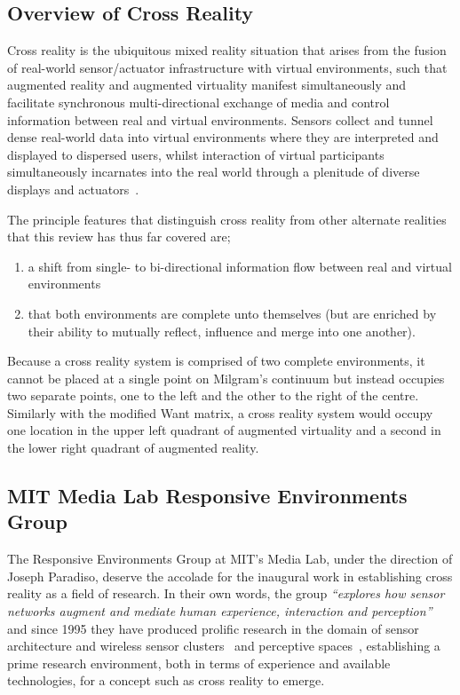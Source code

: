 \subsection{Overview of Cross Reality}
Cross reality is the ubiquitous mixed reality situation that arises from the fusion of real-world sensor/actuator infrastructure with virtual environments, such that augmented reality and augmented virtuality manifest simultaneously and facilitate synchronous multi-directional exchange of media and control information between real and virtual environments. Sensors collect and tunnel dense real-world data into virtual environments where they are interpreted and displayed to dispersed users, whilst interaction of virtual participants simultaneously incarnates into the real world through a plenitude of diverse displays and actuators~\cite{Paradiso2009}.

The principle features that distinguish cross reality from other alternate realities that this review has thus far covered are;
\begin{enumerate}
	\item a shift from single- to bi-directional information flow between real and virtual environments~\cite{kim:practical}
	\item that both environments are complete unto themselves (but are enriched by their ability to mutually reflect, influence and merge into one another).~\cite{lifton:merging}
\end{enumerate}

Because a cross reality system is comprised of two complete environments, it cannot be placed at a single point on Milgram's continuum but instead occupies two separate points, one to the left and the other to the right of the centre. Similarly with the modified Want matrix, a cross reality system would occupy one location in the upper left quadrant of augmented virtuality and a second in the lower right quadrant of augmented reality. 

\subsection{MIT Media Lab Responsive Environments Group}
\label{subsec:responsive_environments_at_mit_media_lab}
The Responsive Environments Group at MIT's Media Lab, under the direction of Joseph Paradiso, deserve the accolade for the inaugural work in establishing cross reality as a field of research. In their own words, the group \textit{``explores how sensor networks augment and mediate human experience, interaction and perception''}~\cite{ResponsiveEnvironmentsGroup} and since 1995 they have produced prolific research in the domain of sensor architecture and wireless sensor clusters~\cite{Paradiso1996, Rowe1999, Burke1996, Paradiso1997, Knaian2000, Teegarden2001, A2007, Ma2002, Bamberg2008, Laibowitz2005, LaPenta2007} and perceptive spaces~\cite{Lifton2001, Paradiso1997a, Paradiso2000, Richardson2004}, establishing a prime research environment, both in terms of experience and available technologies, for a concept such as cross reality to emerge.

